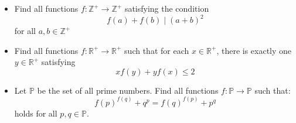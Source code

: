 \documentclass[11pt]{scrartcl}
\begin{document}
\begin{itemize}[label=, leftmargin=0em, itemsep=0.2em]
\begin{btvn}
\end{btvn}
    \item \begin{btvn}
        Find all functions $f:\mathbb{Z^+} \to \mathbb{Z^+}$ satisfying the condition
$$ f(a) + f(b) \mid (a + b)^2$$for all $a,b \in \mathbb{Z^+}$
    \end{btvn}
    \item \begin{btvn}
        Find all functions $f: \mathbb{R}^+ \to \mathbb{R}^+$ such that for each $x \in \mathbb{R}^+$, there is exactly one $y \in \mathbb{R}^+$ satisfying$$xf(y)+yf(x) \leq 2$$
    \end{btvn}
    \item \begin{btvn}
        Let $\mathbb{P}$ be the set of all prime numbers. Find all functions $f:\mathbb{P}\rightarrow\mathbb{P}$ such that:
$$f(p)^{f(q)}+q^p=f(q)^{f(p)}+p^q$$holds for all $p,q\in\mathbb{P}$.
    \end{btvn}
\end{itemize}
\end{document}

